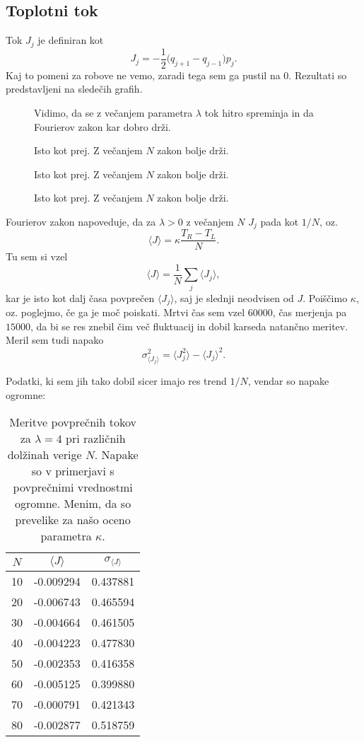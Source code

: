 \documentclass[a4 paper, 12pt]{article}
\begin{document}
\subsection{Toplotni tok}

Tok $J_j$ je definiran kot
\[
	J_j = -\frac{1}{2}\Big(q_{j+1} - q_{j-1}\Big)p_j.
\]
Kaj to pomeni za robove ne vemo, zaradi tega sem ga pustil na 0. Rezultati so predstavljeni
na sledečih grafih.

\begin{figure}[H]
	
	\caption{Vidimo, da se z večanjem parametra $\lambda$ tok hitro spreminja in da Fourierov zakon kar dobro drži.}
\end{figure}

\begin{figure}[H]
	
	\caption{Isto kot prej. Z večanjem $N$ zakon bolje drži.}
\end{figure}

\begin{figure}[H]
	
	\caption{Isto kot prej. Z večanjem $N$ zakon bolje drži.}
\end{figure}

\begin{figure}[H]
	
	\caption{Isto kot prej. Z večanjem $N$ zakon bolje drži.}
\end{figure}

Fourierov zakon napoveduje, da za $\lambda > 0$ z večanjem $N$ $J_j$ pada kot $1/N$, oz.
\[
	\langle J \rangle = \kappa \frac{T_R - T_L}{N}.
\]
Tu sem si vzel
\[
	\langle J \rangle = \frac{1}{N} \sum_j \langle J_j\rangle,
\]
kar je isto kot dalj časa povprečen $\langle J_j \rangle$, saj je slednji neodvisen od $J$. Poiščimo $\kappa$, oz.
poglejmo, če ga je moč poiskati. Mrtvi čas sem vzel $60000$, čas merjenja pa $15000$, da bi se res znebil čim več fluktuacij in
dobil karseda natančno meritev. Meril sem tudi napako
\[
	\sigma^2_{\langle J_j \rangle} = \langle J_j^2 \rangle - \langle J_j \rangle^2.
\]

Podatki, ki sem jih tako dobil sicer imajo res trend $1/N$, vendar so napake ogromne:

\begin{table}[H]\centering
	\caption{Meritve povprečnih tokov za $\lambda = 4$ pri različnih dol\v zinah verige $N$. Napake so v primerjavi
		s povprečnimi vrednostmi ogromne. Menim, da so prevelike za našo oceno parametra $\kappa$.}
	\begin{tabular}{ c | c | c}
		$N$ & $\langle J \rangle$ & $\sigma_{\langle J \rangle}$ \\
		\hline
		 10 & -0.009294 & 0.437881 \\
		 20 & -0.006743 & 0.465594 \\
		 30 & -0.004664 & 0.461505 \\
		 40 & -0.004223 & 0.477830 \\
		 50 & -0.002353 & 0.416358 \\
		 60 & -0.005125 & 0.399880 \\
		 70 & -0.000791 & 0.421343 \\
		 80 & -0.002877 & 0.518759
	\end{tabular}
\end{table}
\end{document}
